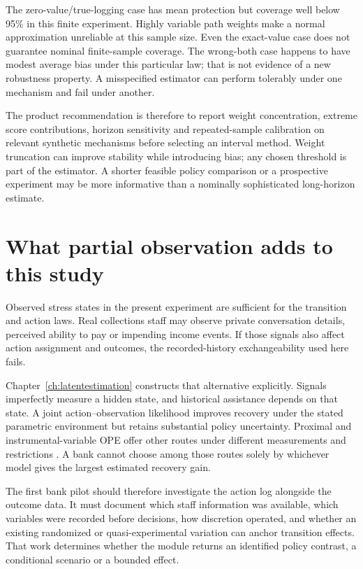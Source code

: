 The zero-value/true-logging case has mean protection but coverage well below
95\% in this finite experiment. Highly variable path weights make a
normal approximation unreliable at this sample size. Even the exact-value
case does not guarantee nominal finite-sample coverage. The wrong-both
case happens to have modest average bias under this particular law; that
is not evidence of a new robustness property. A misspecified estimator can
perform tolerably under one mechanism and fail under another.

The product recommendation is therefore to report weight concentration,
extreme score contributions, horizon sensitivity and repeated-sample
calibration on relevant synthetic mechanisms before selecting an interval
method. Weight truncation can improve stability while introducing bias;
any chosen threshold is part of the estimator. A shorter feasible policy
comparison or a prospective experiment may be more informative than a
nominally sophisticated long-horizon estimate.

\section{What partial observation adds to this study}
Observed stress states in the present experiment are sufficient for the
transition and action laws. Real collections staff may observe private
conversation details, perceived ability to pay or impending income events.
If those signals also affect action assignment and outcomes, the
recorded-history exchangeability used here fails.

Chapter~\ref{ch:latentestimation} constructs that alternative explicitly.
Signals imperfectly measure a hidden state, and historical assistance
depends on that state. A joint action--observation likelihood improves
recovery under the stated parametric environment but retains substantial
policy uncertainty. Proximal and instrumental-variable OPE offer other
routes under different measurements and restrictions
\citep{tennenholtz2020,bennettprox2023,xu2023}. A bank cannot choose
among those routes solely by whichever model gives the largest estimated
recovery gain.

The first bank pilot should therefore investigate the action log alongside
the outcome data. It must document which staff information was available,
which variables were recorded before decisions, how discretion operated,
and whether an existing randomized or quasi-experimental variation can
anchor transition effects. That work determines whether the module returns
an identified policy contrast, a conditional scenario or a bounded effect.

